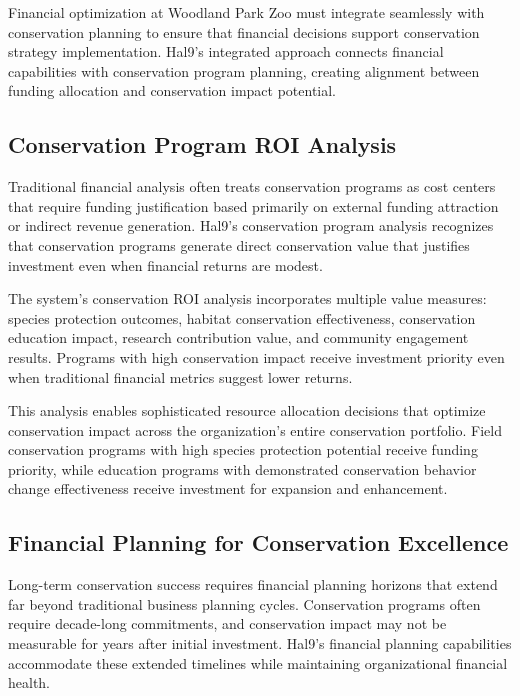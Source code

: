 \documentclass[
  Letterpaper,
]{scrbook}
\begin{document}
Financial optimization at Woodland Park Zoo must integrate seamlessly
with conservation planning to ensure that financial decisions support
conservation strategy implementation. Hal9's integrated approach
connects financial capabilities with conservation program planning,
creating alignment between funding allocation and conservation impact
potential.

\subsection{Conservation Program ROI
Analysis}\label{conservation-program-roi-analysis}

Traditional financial analysis often treats conservation programs as
cost centers that require funding justification based primarily on
external funding attraction or indirect revenue generation. Hal9's
conservation program analysis recognizes that conservation programs
generate direct conservation value that justifies investment even when
financial returns are modest.

The system's conservation ROI analysis incorporates multiple value
measures: species protection outcomes, habitat conservation
effectiveness, conservation education impact, research contribution
value, and community engagement results. Programs with high conservation
impact receive investment priority even when traditional financial
metrics suggest lower returns.

This analysis enables sophisticated resource allocation decisions that
optimize conservation impact across the organization's entire
conservation portfolio. Field conservation programs with high species
protection potential receive funding priority, while education programs
with demonstrated conservation behavior change effectiveness receive
investment for expansion and enhancement.

\subsection{Financial Planning for Conservation
Excellence}\label{financial-planning-for-conservation-excellence}

Long-term conservation success requires financial planning horizons that
extend far beyond traditional business planning cycles. Conservation
programs often require decade-long commitments, and conservation impact
may not be measurable for years after initial investment. Hal9's
financial planning capabilities accommodate these extended timelines
while maintaining organizational financial health.
\end{document}
